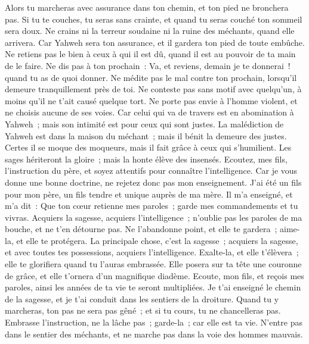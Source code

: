 \begin{multicols}{2}
Alors tu marcheras avec assurance dans ton chemin, et ton pied ne bronchera pas.
Si tu te couches, tu seras sans crainte, et quand tu seras couché ton sommeil sera doux.
Ne crains ni la terreur soudaine ni la ruine des méchants, quand elle arrivera.
Car Yahweh sera ton assurance, et il gardera ton pied de toute embûche.
Ne retiens pas le bien à ceux à qui il est dû, quand il est au pouvoir de ta main de le faire.
Ne dis pas à ton prochain~: Va, et reviens, demain je te donnerai~! quand tu as de quoi donner.
Ne médite pas le mal contre ton prochain, lorsqu'il demeure tranquillement près de toi.
Ne conteste pas sans motif avec quelqu'un, à moins qu'il ne t'ait causé quelque tort.
Ne porte pas envie à l'homme violent, et ne choisis aucune de ses voies.
Car celui qui va de travers est en abomination à Yahweh~; mais son intimité est pour ceux qui sont justes.
La malédiction de Yahweh est dans la maison du méchant~; mais il bénit la demeure des justes.
Certes il se moque des moqueurs, mais il fait grâce à ceux qui s'humilient.
Les sages hériteront la gloire~; mais la honte élève des insensés.
\VerseOne{}Ecoutez, mes fils, l'instruction du père, et soyez attentifs pour connaître l'intelligence.
Car je vous donne une bonne doctrine, ne rejetez donc pas mon enseignement.
J'ai été un fils pour mon père, un fils tendre et unique auprès de ma mère.
Il m'a enseigné, et m'a dit~: Que ton cœur retienne mes paroles~; garde mes commandements et tu vivras.
Acquiers la sagesse, acquiers l'intelligence~; n'oublie pas les paroles de ma bouche, et ne t'en détourne pas.
Ne l'abandonne point, et elle te gardera~; aime-la, et elle te protégera.
La principale chose, c'est la sagesse~; acquiers la sagesse, et avec toutes tes possessions, acquiers l'intelligence.
Exalte-la, et elle t'élèvera~; elle te glorifiera quand tu l'auras embrassée.
Elle posera sur ta tête une couronne de grâce, et elle t'ornera d'un magnifique diadème.
Ecoute, mon fils, et reçois mes paroles, ainsi les années de ta vie te seront multipliées.
Je t'ai enseigné le chemin de la sagesse, et je t'ai conduit dans les sentiers de la droiture.
Quand tu y marcheras, ton pas ne sera pas gêné~; et si tu cours, tu ne chancelleras pas.
Embrasse l'instruction, ne la lâche pas~; garde-la~; car elle est ta vie.
N'entre pas dans le sentier des méchants, et ne marche pas dans la voie des hommes mauvais.

\end{multicols}
